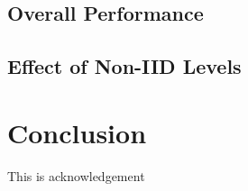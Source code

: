 \documentclass[sigconf]{acmart}
\begin{document}
\subsection{Overall Performance}

\subsection{Effect of Non-IID Levels}

\section{Conclusion}




\begin{acks}
This is acknowledgement
\end{acks}





\end{document}
